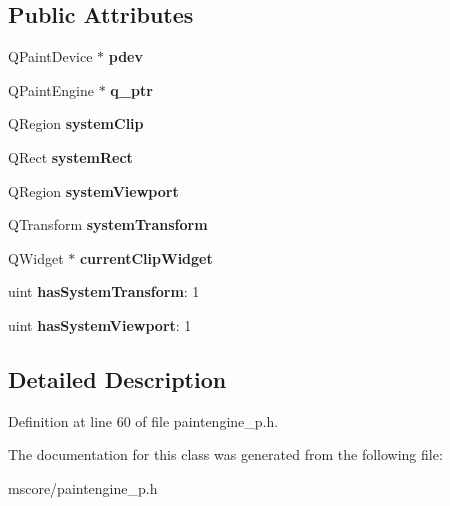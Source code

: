 \subsection*{Public Attributes}
\begin{DoxyCompactItemize}
\item 
\mbox{\label{class_q_paint_engine_private_ad0850c7998a2b4a447b9024e9cf8c9fb}} 
Q\+Paint\+Device $\ast$ {\bfseries pdev}
\item 
\mbox{\label{class_q_paint_engine_private_aa38cf072a6325d447e35a9dfde23fc80}} 
Q\+Paint\+Engine $\ast$ {\bfseries q\+\_\+ptr}
\item 
\mbox{\label{class_q_paint_engine_private_ac22632ec9e7f94e5a2cab6db3c1633ca}} 
Q\+Region {\bfseries system\+Clip}
\item 
\mbox{\label{class_q_paint_engine_private_ac200267657686057b4a2166614d7622a}} 
Q\+Rect {\bfseries system\+Rect}
\item 
\mbox{\label{class_q_paint_engine_private_a5d96b7b1e8894ca92088502b13ec3c39}} 
Q\+Region {\bfseries system\+Viewport}
\item 
\mbox{\label{class_q_paint_engine_private_a76e753434fad9351deeadee6ba32c010}} 
Q\+Transform {\bfseries system\+Transform}
\item 
\mbox{\label{class_q_paint_engine_private_a0f95d2a82a59de8d5bf8d600cfcd1ff8}} 
Q\+Widget $\ast$ {\bfseries current\+Clip\+Widget}
\item 
\mbox{\label{class_q_paint_engine_private_a4f1035b1ed5df62620a3bc7ca7d31e76}} 
uint {\bfseries has\+System\+Transform}\+: 1
\item 
\mbox{\label{class_q_paint_engine_private_a1105fd84175968d254c40306e42eafbd}} 
uint {\bfseries has\+System\+Viewport}\+: 1
\end{DoxyCompactItemize}


\subsection{Detailed Description}


Definition at line 60 of file paintengine\+\_\+p.\+h.



The documentation for this class was generated from the following file\+:\begin{DoxyCompactItemize}
\item 
mscore/paintengine\+\_\+p.\+h\end{DoxyCompactItemize}
